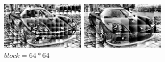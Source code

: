 \documentclass[a4paper,UTF8]{article}
\numberwithin{equation}{section}
\begin{document}
\begin{enumerate}
\begin{figure}[H]
\begin{minipage}[t]{0.30\textwidth}
\caption{$block = 16*16$}
\label{car:16_local}
\end{minipage}
\centering
\begin{minipage}[t]{0.30\textwidth}
\centering
\includegraphics[width=4cm]{car_local_32.png}
\caption{$block = 32*32$}
\label{car:32_local}
\end{minipage}
\centering
\begin{minipage}[t]{0.30\textwidth}
\centering
\includegraphics[width=4cm]{car_local_64.png}
\caption{$block = 64*64$}
\label{car:64_local}
\end{minipage}
\end{figure}
\end{enumerate}








\end{document}
